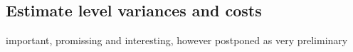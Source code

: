 \documentclass{article}
\def\vc#1{\mathbf{\boldsymbol{#1}}}     %
\def \E{{\mathsf E}}
\def\todo#1{{\color{red}TODO: #1}}
\def\Var{\mathop{\rm Var}}
\newcommand{\jb}[1]{{\color{violet}#1}}  %
\begin{document}
\subsection{Estimate level variances and costs}\label{est_var_cost}
\jb{important, promissing and interesting, however postponed as very preliminary}
% 
% 
% 
% 
% 
% 
% 
% 
\end{document}
